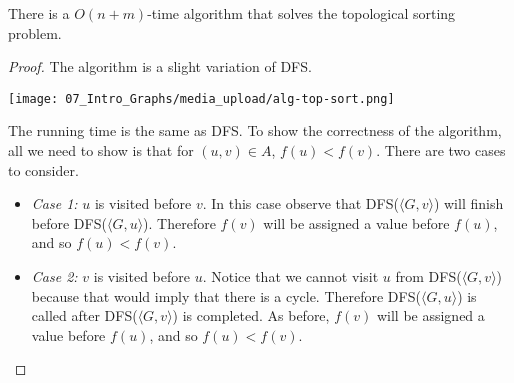 \begin{flex}
\begin{theorem}
There is a $O(n+m)$-time algorithm that solves the topological sorting problem.
\end{theorem}

\begin{proof}
The algorithm is a slight variation of DFS.

\begin{center}
    \texttt{[image: 07\_Intro\_Graphs/media\_upload/alg-top-sort.png]}
\end{center}

The running time is the same as DFS. To show the correctness of the algorithm, all we need to show is that for $(u,v) \in A$, $f(u) < f(v)$. There are two cases to consider.
\begin{itemize}
    \item \emph{Case 1:} $u$ is visited before $v$. In this case observe that DFS($\langle G, v\rangle$) will finish before DFS($\langle G, u\rangle$). Therefore $f(v)$ will be assigned a value before $f(u)$, and so $f(u) < f(v)$. 
    \item \emph{Case 2:} $v$ is visited before $u$. Notice that we cannot visit $u$ from DFS($\langle G, v\rangle$) because that would imply that there is a cycle. Therefore DFS($\langle G, u\rangle$) is called after DFS($\langle G, v\rangle$) is completed. As before, $f(v)$ will be assigned a value before $f(u)$, and so $f(u) < f(v)$. 
\end{itemize}
\end{proof}
\end{flex}


